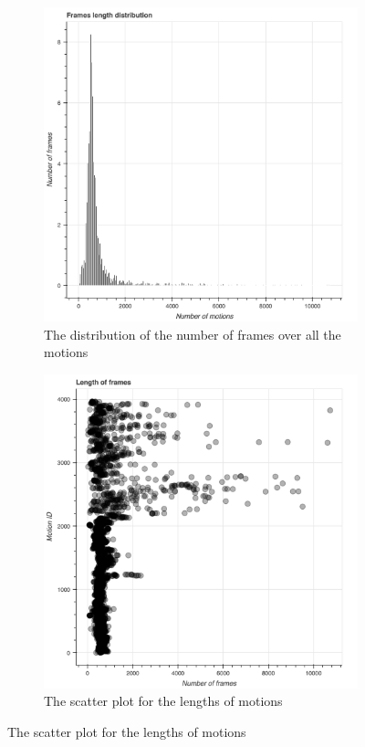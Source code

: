 \begin{figure}
	\centering
	\begin{subfigure}[b]{0.47\textwidth}
		\centering
		\includegraphics[width=\textwidth]{img/num-frames-ditro.png}
		\caption{The distribution of the number of frames over all the motions}
		\label{fig:num_frames_distro}
	\end{subfigure}
	\hfill
	\begin{subfigure}[b]{0.47\textwidth}
		\centering
		\includegraphics[width=\textwidth]{img/scatter-num-frames.png}
		\caption{The scatter plot for the lengths of motions}
		\label{fig:scatterplot-num-frames}
	\end{subfigure}
\end{figure}
